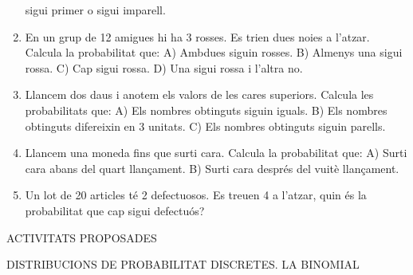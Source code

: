 \begin{enumerate}
  sigui primer o sigui imparell.
\item
  En un grup de 12 amigues hi ha 3 rosses. Es trien dues noies a
  l'atzar. Calcula la probabilitat que: A) Ambdues siguin rosses. B)
  Almenys una sigui rossa. C) Cap sigui rossa. D) Una sigui rossa i
  l'altra no.
\item
  Llancem dos daus i anotem els valors de les cares superiors. Calcula
  les probabilitats que: A) Els nombres obtinguts siguin iguals. B) Els
  nombres obtinguts difereixin en 3 unitats. C) Els nombres obtinguts
  siguin parells.
\item
  Llancem una moneda fins que surti cara. Calcula la probabilitat que:
  A) Surti cara abans del quart llançament. B) Surti cara després del
  vuitè llançament.
\item
  Un lot de 20 articles té 2 defectuosos. Es treuen 4 a l'atzar, quin és
  la probabilitat que cap sigui defectuós?
\end{enumerate}

ACTIVITATS PROPOSADES

DISTRIBUCIONS DE PROBABILITAT DISCRETES. LA BINOMIAL

